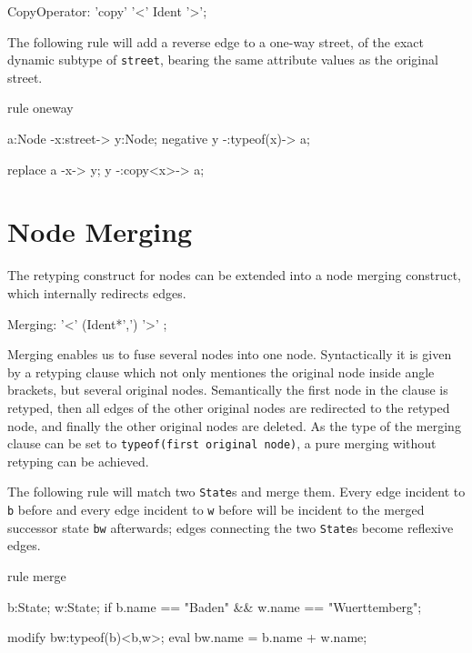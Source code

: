 \begin{rail}
  CopyOperator: 'copy' '<' Ident '>';
\end{rail}

\begin{example}
The following rule will add a reverse edge to a one-way street, of the exact dynamic subtype of \texttt{street}, bearing the same attribute values as the original street.
\begin{grgen}
rule oneway {
  a:Node -x:street-> y:Node;
  negative {
    y -:typeof(x)-> a;
  }

  replace {
    a -x-> y;
    y -:copy<x>-> a;
  }
}
\end{grgen}
\end{example}



\section{Node Merging} \label{sec:merge}
The retyping construct for nodes can be extended into a node merging construct,
which internally redirects edges.

\begin{rail}
  Merging: '<' (Ident*',') '>' ;
\end{rail}

Merging enables us to fuse several nodes into one node.
Syntactically it is given by a retyping clause which not only mentiones the original node inside angle brackets, but several original nodes.
Semantically the first node in the clause is retyped, then all edges of the other original nodes are redirected to the retyped node, and finally the other original nodes are deleted.
As the type of the merging clause can be set to \texttt{typeof(first original node)}, a pure merging without retyping can be achieved.

\begin{example}
The following rule will match two \texttt{State}s and merge them.
Every edge incident to \texttt{b} before and every edge incident to \texttt{w} before will be incident to the merged successor state \texttt{bw} afterwards; edges connecting the two \texttt{State}s become reflexive edges.
\begin{grgen}
rule merge {
  b:State;
  w:State;
  if { b.name == "Baden" && w.name == "Wuerttemberg"; }

  modify {
    bw:typeof(b)<b,w>;
    eval { bw.name = b.name + w.name; }
  }
}
\end{grgen}
\end{example}


